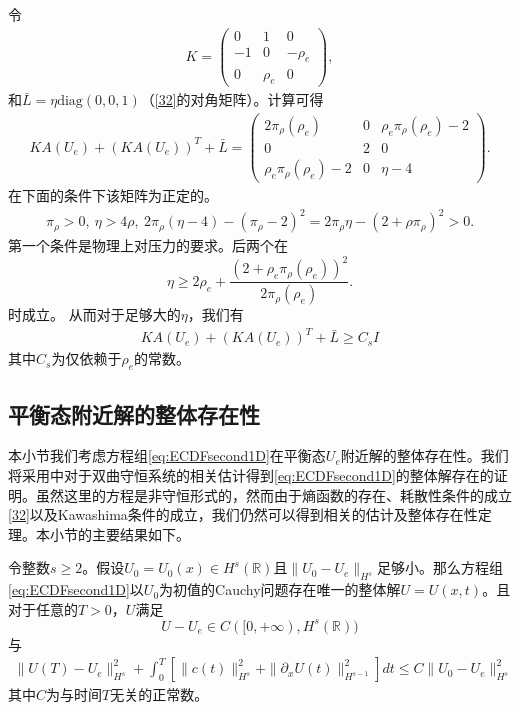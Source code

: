 令
\begin{eqnarray}\label{33}
K=\left( \begin{array}{ccc}
	0 & 1 & 0 \\
	-1 & 0 & -\rho_e \\
	0 & \rho_e & 0
	\end{array} \right),
\end{eqnarray}
和$\bar{L} = \eta\mbox{diag}(0, 0, 1)$（\eqref{32}的对角矩阵）。计算可得
\begin{eqnarray*}
K A(U_e) + (K A(U_e))^T + \bar{L} =
	\left( \begin{array}{ccc}
	2 \pi_\rho(\rho_e) & 0 & \rho_e \pi_\rho(\rho_e) -2  \\
	0 & 2 & 0 \\
	\rho_e \pi_\rho(\rho_e) - 2 & 0 & \eta -4 	
	\end{array} \right).
\end{eqnarray*}
在下面的条件下该矩阵为正定的。
\begin{eqnarray*}
\pi_\rho  > 0, \ \eta > 4 \rho, \ 2\pi_\rho(\eta - 4)-(\pi_{\rho}-2)^2 = 2 \pi_\rho \eta  - (2 +  \rho \pi_\rho)^2 >0.
\end{eqnarray*}
第一个条件是物理上对压力的要求。后两个在
$$
\eta \ge 2 \rho_e +\frac{(2 + \rho_e \pi_\rho(\rho_e))^2}{2 \pi_\rho(\rho_e)}.
$$
时成立。
从而对于足够大的$\eta$，我们有
\begin{eqnarray}\label{35}
K A(U_e) + (K A(U_e))^T + \bar{L} \ge C_s I
\end{eqnarray}
其中$C_s$为仅依赖于$\rho_e$的常数。

\subsection{平衡态附近解的整体存在性}
本小节我们考虑方程组\eqref{eq:ECDFsecond1D}在平衡态$U_e$附近解的整体存在性。我们将采用\cite{yong2004entropy,kawashima2009decay}中对于双曲守恒系统的相关估计得到\eqref{eq:ECDFsecond1D}的整体解存在的证明。虽然这里的方程是非守恒形式的，然而由于熵函数的存在、耗散性条件的成立\eqref{32}以及Kawashima条件的成立，我们仍然可以得到相关的估计及整体存在性定理。本小节的主要结果如下。

\begin{theorem} \label{theoremglobal}
令整数$s \ge 2$。假设$U_0=U_0(x) \in H^s(\mathbb{R})$且$\|U_0 -U_e\|_{H^s}$足够小。那么方程组\eqref{eq:ECDFsecond1D}以$U_0$为初值的Cauchy问题存在唯一的整体解$U=U(x,t)$。且对于任意的$T>0$，$U$满足
$$
U-U_e \in C([0,+\infty),H^s(\mathbb{R}))
$$
与
\begin{eqnarray}\label{41}
\|U(T)-U_e\|^2_{H^s} + \int_0^T \left[ \|c(t)\|^2_{H^s} + \|\partial_x U(t)\|^2_{H^{s-1}} \right] dt \le C \|U_0 -U_e\|^2_{H^s}
\end{eqnarray}
其中$C$为与时间$T$无关的正常数。
\end{theorem}

